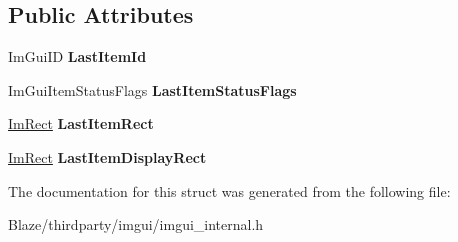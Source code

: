 \subsection*{Public Attributes}
\begin{DoxyCompactItemize}
\item 
\mbox{\label{structImGuiItemHoveredDataBackup_a5e0b18013d983269deba7976666fc501}} 
Im\+Gui\+ID {\bfseries Last\+Item\+Id}
\item 
\mbox{\label{structImGuiItemHoveredDataBackup_a7454f4ebf549581f0e70625a010786cf}} 
Im\+Gui\+Item\+Status\+Flags {\bfseries Last\+Item\+Status\+Flags}
\item 
\mbox{\label{structImGuiItemHoveredDataBackup_ae489c222bed561950104a46ddf1387f3}} 
\hyperlink{structImRect}{Im\+Rect} {\bfseries Last\+Item\+Rect}
\item 
\mbox{\label{structImGuiItemHoveredDataBackup_a8bab24e0a70229e2f0cb1aae0d510252}} 
\hyperlink{structImRect}{Im\+Rect} {\bfseries Last\+Item\+Display\+Rect}
\end{DoxyCompactItemize}


The documentation for this struct was generated from the following file\+:\begin{DoxyCompactItemize}
\item 
Blaze/thirdparty/imgui/imgui\+\_\+internal.\+h\end{DoxyCompactItemize}
